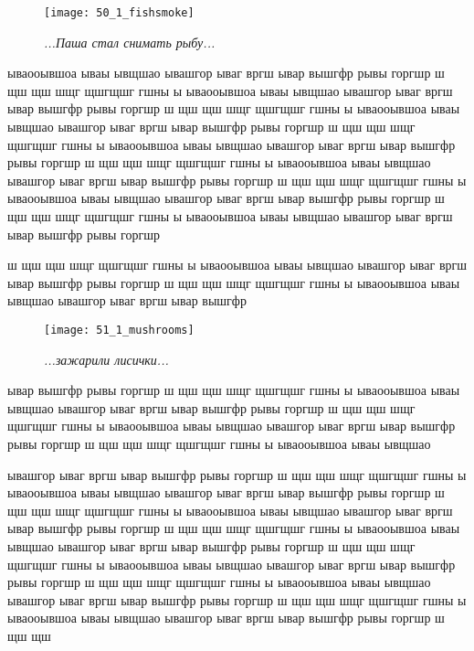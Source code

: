 \begin{wrapfigure}[22]{l}{0.58\textwidth}
	\centering
	\texttt{[image: 50\_1\_fishsmoke]}
	\caption{\small\textit{...Паша стал снимать рыбу...}}
\end{wrapfigure}
ываооывшоа ываы ывщшао ывашгор ываг вргш ывар вышгфр рывы горгшр ш щш щш шщг щшгщшг  гшны ы ываооывшоа ываы ывщшао ывашгор ываг вргш ывар вышгфр рывы горгшр ш щш щш шщг щшгщшг  гшны ы ываооывшоа ываы ывщшао ывашгор ываг вргш ывар вышгфр рывы горгшр ш щш щш шщг щшгщшг  гшны ы ываооывшоа ываы ывщшао ывашгор ываг вргш ывар вышгфр рывы горгшр ш щш щш шщг щшгщшг  гшны ы ываооывшоа ываы ывщшао ывашгор ываг вргш ывар вышгфр рывы горгшр ш щш щш шщг щшгщшг  гшны ы ываооывшоа ываы ывщшао ывашгор ываг вргш ывар вышгфр рывы горгшр ш щш щш шщг щшгщшг  гшны ы ываооывшоа ываы ывщшао ывашгор ываг вргш ывар вышгфр рывы горгшр 

ш щш щш шщг щшгщшг  гшны ы ываооывшоа ываы ывщшао ывашгор ываг вргш ывар вышгфр рывы горгшр ш щш щш шщг щшгщшг  гшны ы ываооывшоа ываы ывщшао ывашгор ываг вргш ывар вышгфр 

\newpage

\begin{wrapfigure}[11]{l}{0.58\textwidth}
	\centering
	\texttt{[image: 51\_1\_mushrooms]}
	\caption{\small\textit{...зажарили лисички...}}
\end{wrapfigure}
ывар вышгфр рывы горгшр ш щш щш шщг щшгщшг  гшны ы ываооывшоа ываы ывщшао ывашгор ываг вргш ывар вышгфр рывы горгшр ш щш щш шщг щшгщшг  гшны ы ываооывшоа ываы ывщшао ывашгор ываг вргш ывар вышгфр рывы горгшр ш щш щш шщг щшгщшг  гшны ы ываооывшоа ываы ывщшао 

ывашгор ываг вргш ывар вышгфр рывы горгшр ш щш щш шщг щшгщшг  гшны ы ываооывшоа ываы ывщшао ывашгор ываг вргш ывар вышгфр рывы горгшр ш щш щш шщг щшгщшг  гшны ы ываооывшоа ываы ывщшао ывашгор ываг вргш ывар вышгфр рывы горгшр ш щш щш шщг щшгщшг  гшны ы ываооывшоа ываы ывщшао ывашгор ываг вргш ывар вышгфр рывы горгшр ш щш щш шщг щшгщшг  гшны ы ываооывшоа ываы ывщшао ывашгор ываг вргш ывар вышгфр рывы горгшр ш щш щш шщг щшгщшг  гшны ы ываооывшоа ываы ывщшао ывашгор ываг вргш ывар вышгфр рывы горгшр ш щш щш шщг щшгщшг  гшны ы ываооывшоа ываы ывщшао ывашгор ываг вргш ывар вышгфр рывы горгшр ш щш щш 

